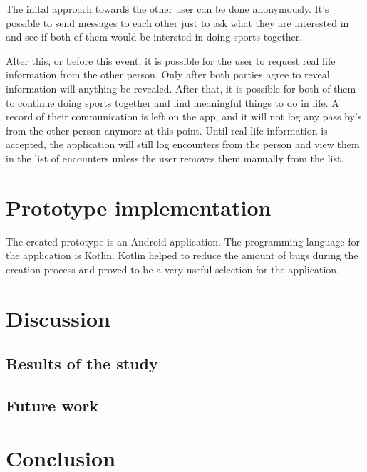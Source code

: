 The inital approach towards the other user can be done anonymously. It's possible to send messages to each other just to ask what they are interested in and see if both of them would be intersted in doing sports together.

After this, or before this event, it is possible for the user to request real life information from the other person. Only after both parties agree to reveal information will anything be revealed. After that, it is possible for both of them to continue doing sports together and find meaningful things to do in life. A record of their communication is left on the app, and it will not log any pass by's from the other person anymore at this point. Until real-life information is accepted, the application will still log encounters from the person and view them in the list of encounters unless the user removes them manually from the list.

\section{Prototype implementation}

The created prototype is an Android application. The programming language for the application is Kotlin. Kotlin helped to reduce the amount of bugs during the creation process and proved to be a very useful selection for the application.

\section{Discussion}
\subsection{Results of the study}
\subsection{Future work}

\section{Conclusion}

